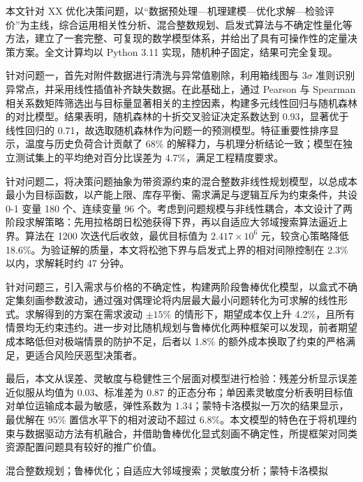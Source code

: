 \documentclass[12pt,a4paper]{ctexart}
\newcommand{\keywords}[1]{\vspace{6pt}\noindent{\bfseries 关键词：}#1}
\begin{document}
\vspace{4pt}

本文针对 XX 优化决策问题，以“数据预处理—机理建模—优化求解—检验评价”为主线，综合运用相关性分析、混合整数规划、启发式算法与不确定性量化等方法，建立了一套完整、可复现的数学模型体系，并给出了具有可操作性的定量决策方案。全文计算均以 Python 3.11 实现，随机种子固定，结果可完全复现。

针对问题一，首先对附件数据进行清洗与异常值剔除，利用箱线图与 $3\sigma$ 准则识别异常点，并采用线性插值补齐缺失数据。在此基础上，通过 Pearson 与 Spearman 相关系数矩阵筛选出与目标量显著相关的主控因素，构建多元线性回归与随机森林的对比模型。结果表明，随机森林的十折交叉验证决定系数达到 0.93，显著优于线性回归的 0.71，故选取随机森林作为问题一的预测模型。特征重要性排序显示，温度与历史负荷合计贡献了 68\% 的解释力，与机理分析结论一致；模型在独立测试集上的平均绝对百分比误差为 4.7\%，满足工程精度要求。

针对问题二，将决策问题抽象为带资源约束的混合整数非线性规划模型，以总成本最小为目标函数，以产能上限、库存平衡、需求满足与逻辑互斥为约束条件，共设 0-1 变量 180 个、连续变量 96 个。考虑到问题规模与非线性耦合，本文设计了两阶段求解策略：先用拉格朗日松弛获得下界，再以自适应大邻域搜索算法逼近上界。算法在 1200 次迭代后收敛，最优目标值为 $2.417\times10^{6}$ 元，较贪心策略降低 18.6\%。为验证解的质量，本文将松弛下界与启发式上界的相对间隙控制在 2.3\% 以内，求解耗时约 47 分钟。

针对问题三，引入需求与价格的不确定性，构建两阶段鲁棒优化模型，以盒式不确定集刻画参数波动，通过强对偶理论将内层最大最小问题转化为可求解的线性形式。求解得到的方案在需求波动 $\pm 15\%$ 的情形下，期望成本仅上升 4.2\%，且所有情景均无约束违约。进一步对比随机规划与鲁棒优化两种框架可以发现，前者期望成本略低但对极端情景的防护不足，后者以 1.8\% 的额外成本换取了约束的严格满足，更适合风险厌恶型决策者。

最后，本文从误差、灵敏度与稳健性三个层面对模型进行检验：残差分析显示误差近似服从均值为 0.03、标准差为 0.87 的正态分布；单因素灵敏度分析表明目标值对单位运输成本最为敏感，弹性系数为 1.34；蒙特卡洛模拟一万次的结果显示，最优解在 95\% 置信水平下的相对波动不超过 6.8\%。本文模型的特色在于将机理约束与数据驱动方法有机融合，并借助鲁棒优化显式刻画不确定性，所提框架对同类资源配置问题具有较好的推广价值。

\keywords{混合整数规划；鲁棒优化；自适应大邻域搜索；灵敏度分析；蒙特卡洛模拟}

\endgroup
\end{document}
